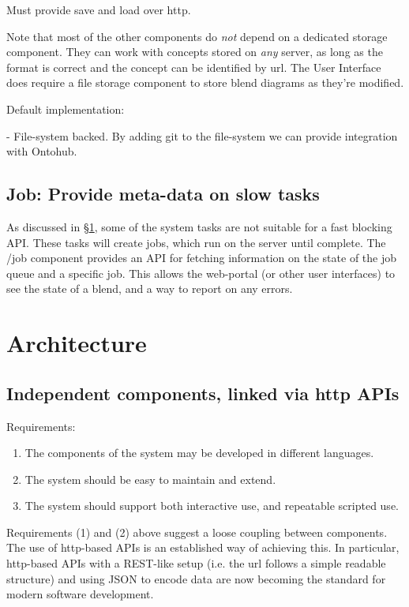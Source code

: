 \documentclass[10pt]{article}
\begin{document}
Must provide save and load over http.

Note that most of the other components do {\em not} depend on a dedicated storage component. They can work with concepts stored on {\em any} server, as long as the format is correct and the concept can be identified by url. The User Interface does require a file storage component to store blend diagrams as they're modified.

Default implementation: 

 - File-system backed. By adding git to the file-system we can provide integration with Ontohub.

\subsection{Job: Provide meta-data on slow tasks}


As discussed in \S\ref{sec:architecture}, some of the system tasks are not suitable for
a fast blocking API. These tasks will create jobs, which run on the server until complete.
The /job component provides an API for fetching information on the state of the job queue and a specific job. This allows the web-portal (or other user interfaces) to see the state of a blend, and a way to
report on any errors.

\section{Architecture}\label{sec:architecture}

\subsection{Independent components, linked via http APIs}

Requirements:  
\begin{enumerate}
\item The components of the system may be developed in different languages.
\item The system should be easy to maintain and extend.
\item The system should support both interactive use, and repeatable scripted use.
\end{enumerate}
Requirements (1) and (2) above suggest a loose coupling between components. The use of http-based APIs is an established way of achieving this. In particular, http-based APIs with a REST-like setup (i.e. the url follows a simple readable structure) and using JSON to encode data are now becoming the standard for modern software development. 
\end{document}
